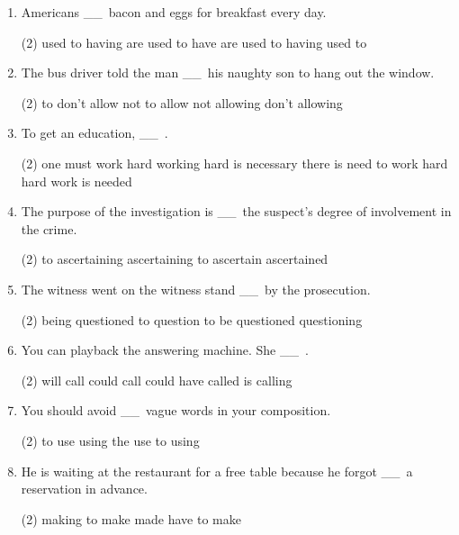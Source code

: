 \documentclass{yufa}
\newcommand\ttu{ \_\_\ }
\begin{document}
\begin{enumerate}
\item Americans \ttu bacon and eggs for breakfast every day.
  \begin{tasks}(2)
    \task used to having
    \task are used to have
    \task are used to having
    \task used to
  \end{tasks}

\item The bus driver told the man \ttu his naughty son to hang out the window.
  \begin{tasks}(2)
    \task to don't allow
    \task not to allow
    \task not allowing
    \task don't allowing
  \end{tasks}

\item To get an education, \ttu.
  \begin{tasks}(2)
    \task one must work hard
    \task working hard is necessary
    \task there is need to work hard
    \task hard work is needed
  \end{tasks}

\item The purpose of the investigation is \ttu the suspect's degree of involvement in the crime.
  \begin{tasks}(2)
    \task to ascertaining
    \task ascertaining
    \task to ascertain
    \task ascertained
  \end{tasks}

\item The witness went on the witness stand \ttu by the prosecution.
  \begin{tasks}(2)
    \task being questioned
    \task to question
    \task to be questioned
    \task questioning
  \end{tasks}

\item You can playback the answering machine. She \ttu.
  \begin{tasks}(2)
    \task will call
    \task could call
    \task could have called
    \task is calling
  \end{tasks}

\item You should avoid \ttu vague words in your composition.
  \begin{tasks}(2)
    \task to use
    \task using
    \task the use
    \task to using
  \end{tasks}

\item He is waiting at the restaurant for a free table because he forgot \ttu a reservation in advance.
  \begin{tasks}(2)
    \task making
    \task to make
    \task made
    \task have to make
  \end{tasks}


\end{enumerate}
\end{document}
